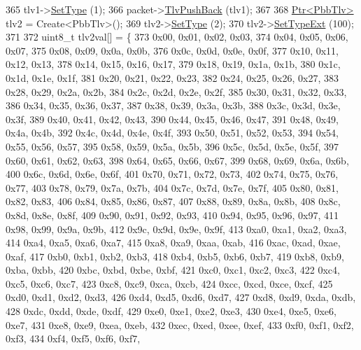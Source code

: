 \begin{DoxyCode}
365     tlv1->\hyperlink{classns3_1_1PbbTlv_a90a0452018ed364ac37c3ad116dd718b}{SetType} (1);
366     packet->\hyperlink{classns3_1_1PbbPacket_a34935793e729a106c176db99c969cb42}{TlvPushBack} (tlv1);
367 
368     \hyperlink{classns3_1_1Ptr}{Ptr<PbbTlv>} tlv2 = Create<PbbTlv>();
369     tlv2->\hyperlink{classns3_1_1PbbTlv_a90a0452018ed364ac37c3ad116dd718b}{SetType} (2);
370     tlv2->\hyperlink{classns3_1_1PbbTlv_aebc3df25cac008223fda7d3954c17638}{SetTypeExt} (100);
371 
372     uint8\_t tlv2val[] = \{
373       0x00, 0x01, 0x02, 0x03,
374       0x04, 0x05, 0x06, 0x07,
375       0x08, 0x09, 0x0a, 0x0b,
376       0x0c, 0x0d, 0x0e, 0x0f,
377       0x10, 0x11, 0x12, 0x13,
378       0x14, 0x15, 0x16, 0x17,
379       0x18, 0x19, 0x1a, 0x1b,
380       0x1c, 0x1d, 0x1e, 0x1f,
381       0x20, 0x21, 0x22, 0x23,
382       0x24, 0x25, 0x26, 0x27,
383       0x28, 0x29, 0x2a, 0x2b,
384       0x2c, 0x2d, 0x2e, 0x2f,
385       0x30, 0x31, 0x32, 0x33,
386       0x34, 0x35, 0x36, 0x37,
387       0x38, 0x39, 0x3a, 0x3b,
388       0x3c, 0x3d, 0x3e, 0x3f,
389       0x40, 0x41, 0x42, 0x43,
390       0x44, 0x45, 0x46, 0x47,
391       0x48, 0x49, 0x4a, 0x4b,
392       0x4c, 0x4d, 0x4e, 0x4f,
393       0x50, 0x51, 0x52, 0x53,
394       0x54, 0x55, 0x56, 0x57,
395       0x58, 0x59, 0x5a, 0x5b,
396       0x5c, 0x5d, 0x5e, 0x5f,
397       0x60, 0x61, 0x62, 0x63,
398       0x64, 0x65, 0x66, 0x67,
399       0x68, 0x69, 0x6a, 0x6b,
400       0x6c, 0x6d, 0x6e, 0x6f,
401       0x70, 0x71, 0x72, 0x73,
402       0x74, 0x75, 0x76, 0x77,
403       0x78, 0x79, 0x7a, 0x7b,
404       0x7c, 0x7d, 0x7e, 0x7f,
405       0x80, 0x81, 0x82, 0x83,
406       0x84, 0x85, 0x86, 0x87,
407       0x88, 0x89, 0x8a, 0x8b,
408       0x8c, 0x8d, 0x8e, 0x8f,
409       0x90, 0x91, 0x92, 0x93,
410       0x94, 0x95, 0x96, 0x97,
411       0x98, 0x99, 0x9a, 0x9b,
412       0x9c, 0x9d, 0x9e, 0x9f,
413       0xa0, 0xa1, 0xa2, 0xa3,
414       0xa4, 0xa5, 0xa6, 0xa7,
415       0xa8, 0xa9, 0xaa, 0xab,
416       0xac, 0xad, 0xae, 0xaf,
417       0xb0, 0xb1, 0xb2, 0xb3,
418       0xb4, 0xb5, 0xb6, 0xb7,
419       0xb8, 0xb9, 0xba, 0xbb,
420       0xbc, 0xbd, 0xbe, 0xbf,
421       0xc0, 0xc1, 0xc2, 0xc3,
422       0xc4, 0xc5, 0xc6, 0xc7,
423       0xc8, 0xc9, 0xca, 0xcb,
424       0xcc, 0xcd, 0xce, 0xcf,
425       0xd0, 0xd1, 0xd2, 0xd3,
426       0xd4, 0xd5, 0xd6, 0xd7,
427       0xd8, 0xd9, 0xda, 0xdb,
428       0xdc, 0xdd, 0xde, 0xdf,
429       0xe0, 0xe1, 0xe2, 0xe3,
430       0xe4, 0xe5, 0xe6, 0xe7,
431       0xe8, 0xe9, 0xea, 0xeb,
432       0xec, 0xed, 0xee, 0xef,
433       0xf0, 0xf1, 0xf2, 0xf3,
434       0xf4, 0xf5, 0xf6, 0xf7,

\end{DoxyCode}
